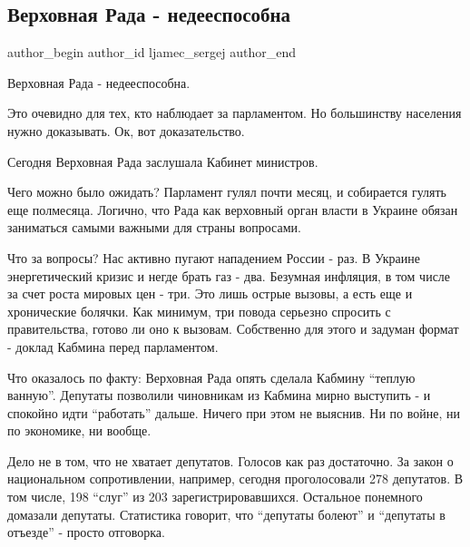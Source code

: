  
 
 
 
 
 
\subsection{Верховная Рада - недееспособна}
\label{sec:28_01_2022.fb.ljamec_sergej.1.verhovna_rada_nedeesposobna}
 
\ifcmt
 author_begin
   author_id ljamec_sergej
 author_end
\fi

Верховная Рада - недееспособна.

Это очевидно для тех, кто наблюдает за парламентом. Но большинству населения
нужно доказывать. Ок, вот доказательство.

Сегодня Верховная Рада заслушала Кабинет министров.

Чего можно было ожидать? Парламент гулял почти месяц, и собирается гулять еще
полмесяца. Логично, что Рада как верховный орган власти в Украине обязан
заниматься самыми важными для страны вопросами.


Что за вопросы? Нас активно пугают нападением России - раз. В Украине
энергетический кризис и негде брать газ - два. Безумная инфляция, в том числе
за счет роста мировых цен - три. Это лишь острые вызовы, а есть еще и
хронические болячки. Как минимум, три повода серьезно спросить с правительства,
готово ли оно к вызовам. Собственно для этого и задуман формат - доклад Кабмина
перед парламентом.

Что оказалось по факту: Верховная Рада опять сделала Кабмину \enquote{теплую ванную}.
Депутаты позволили чиновникам из Кабмина мирно выступить - и спокойно идти
\enquote{работать} дальше. Ничего при этом не выяснив. Ни по войне, ни по экономике, ни
вообще.

Дело не в том, что не хватает депутатов. Голосов как раз достаточно. За закон о
национальном сопротивлении, например, сегодня проголосовали 278 депутатов. В
том числе, 198 \enquote{слуг} из 203 зарегистрировавшихся. Остальное понемного домазали
депутаты. Статистика говорит, что \enquote{депутаты болеют} и \enquote{депутаты в отъезде} -
просто отговорка.

